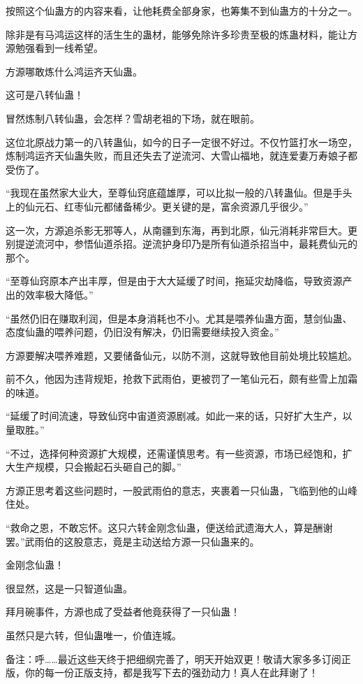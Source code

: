 \begin{this_body}
按照这个仙蛊方的内容来看，让他耗费全部身家，也筹集不到仙蛊方的十分之一。

除非是有马鸿运这样的活生生的蛊材，能够免除许多珍贵至极的炼蛊材料，能让方源勉强看到一线希望。

方源哪敢炼什么鸿运齐天仙蛊。

这可是八转仙蛊！

冒然炼制八转仙蛊，会怎样？雪胡老祖的下场，就在眼前。

这位北原战力第一的八转蛊仙，如今的日子一定很不好过。不仅竹篮打水一场空，炼制鸿运齐天仙蛊失败，而且还失去了逆流河、大雪山福地，就连爱妻万寿娘子都受伤了。

“我现在虽然家大业大，至尊仙窍底蕴雄厚，可以比拟一般的八转蛊仙。但是手头上的仙元石、红枣仙元都储备稀少。更关键的是，富余资源几乎很少。”

这一次，方源追杀影无邪等人，从南疆到东海，再到北原，仙元消耗非常巨大。更别提逆流河中，参悟仙道杀招。逆流护身印乃是所有仙道杀招当中，最耗费仙元的那个。

“至尊仙窍原本产出丰厚，但是由于大大延缓了时间，拖延灾劫降临，导致资源产出的效率极大降低。”

“虽然仍旧在赚取利润，但是本身消耗也不小。尤其是喂养仙蛊方面，慧剑仙蛊、态度仙蛊的喂养问题，仍旧没有解决，仍旧需要继续投入资金。”

方源要解决喂养难题，又要储备仙元，以防不测，这就导致他目前处境比较尴尬。

前不久，他因为违背规矩，抢救下武雨伯，更被罚了一笔仙元石，颇有些雪上加霜的味道。

“延缓了时间流速，导致仙窍中宙道资源剧减。如此一来的话，只好扩大生产，以量取胜。”

“不过，选择何种资源扩大规模，还需谨慎思考。有一些资源，市场已经饱和，扩大生产规模，只会搬起石头砸自己的脚。”

方源正思考着这些问题时，一股武雨伯的意志，夹裹着一只仙蛊，飞临到他的山峰住处。

“救命之恩，不敢忘怀。这只六转金刚念仙蛊，便送给武遗海大人，算是酬谢罢。”武雨伯的这股意志，竟是主动送给方源一只仙蛊来的。

金刚念仙蛊！

很显然，这是一只智道仙蛊。

拜月碗事件，方源也成了受益者他竟获得了一只仙蛊！

虽然只是六转，但仙蛊唯一，价值连城。

备注：呼……最近这些天终于把细纲完善了，明天开始双更！敬请大家多多订阅正版，你的每一份正版支持，都是我写下去的强劲动力！真人在此拜谢了！

\end{this_body}

